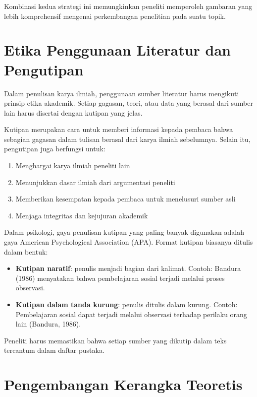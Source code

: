 \documentclass[
  indonesian,
  letterpaper,
  DIV=11,
  numbers=noendperiod]{scrreprt}
\providecommand{\tightlist}{%
  \setlength{\itemsep}{0pt}\setlength{\parskip}{0pt}}
\begin{document}
Kombinasi kedua strategi ini memungkinkan peneliti memperoleh gambaran
yang lebih komprehensif mengenai perkembangan penelitian pada suatu
topik.

\section{Etika Penggunaan Literatur dan
Pengutipan}\label{etika-penggunaan-literatur-dan-pengutipan}

Dalam penulisan karya ilmiah, penggunaan sumber literatur harus
mengikuti prinsip etika akademik. Setiap gagasan, teori, atau data yang
berasal dari sumber lain harus disertai dengan kutipan yang jelas.

Kutipan merupakan cara untuk memberi informasi kepada pembaca bahwa
sebagian gagasan dalam tulisan berasal dari karya ilmiah sebelumnya.
Selain itu, pengutipan juga berfungsi untuk:

\begin{enumerate}
\def\labelenumi{\arabic{enumi}.}
\tightlist
\item
  Menghargai karya ilmiah peneliti lain
\item
  Menunjukkan dasar ilmiah dari argumentasi peneliti
\item
  Memberikan kesempatan kepada pembaca untuk menelusuri sumber asli
\item
  Menjaga integritas dan kejujuran akademik
\end{enumerate}

Dalam psikologi, gaya penulisan kutipan yang paling banyak digunakan
adalah gaya American Psychological Association (APA). Format kutipan
biasanya ditulis dalam bentuk:

\begin{itemize}
\tightlist
\item
  \textbf{Kutipan naratif}: penulis menjadi bagian dari kalimat. Contoh:
  Bandura (1986) menyatakan bahwa pembelajaran sosial terjadi melalui
  proses observasi.
\item
  \textbf{Kutipan dalam tanda kurung}: penulis ditulis dalam kurung.
  Contoh: Pembelajaran sosial dapat terjadi melalui observasi terhadap
  perilaku orang lain (Bandura, 1986).
\end{itemize}

Peneliti harus memastikan bahwa setiap sumber yang dikutip dalam teks
tercantum dalam daftar pustaka.

\section{Pengembangan Kerangka
Teoretis}\label{pengembangan-kerangka-teoretis}
\end{document}
